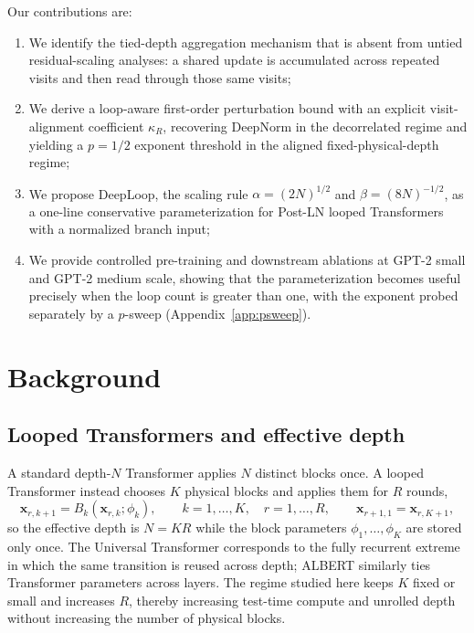 \documentclass[11pt]{airesearch}
\begin{document}
Our contributions are:
\begin{enumerate}[leftmargin=*, itemsep=1pt, topsep=1pt]
    \item We identify the tied-depth aggregation mechanism that is absent from
    untied residual-scaling analyses: a shared update is accumulated across
    repeated visits and then read through those same visits;
    \item We derive a loop-aware first-order perturbation bound with an
    explicit visit-alignment coefficient $\kappa_R$, recovering DeepNorm in the
    decorrelated regime and yielding a $p=1/2$ exponent threshold in the
    aligned fixed-physical-depth regime;
    \item We propose DeepLoop, the scaling rule
    $\alpha=(2N)^{1/2}$ and $\beta=(8N)^{-1/2}$, as a one-line conservative
    parameterization for Post-LN looped Transformers with a normalized branch
    input;
    \item We provide controlled pre-training and downstream ablations at GPT-2
    small and GPT-2 medium scale, showing that the parameterization becomes
    useful precisely when the loop count is greater than one, with the
    exponent probed separately by a $p$-sweep (Appendix~\ref{app:psweep}).
\end{enumerate}
\section{Background}
\label{sec:background}

\subsection{Looped Transformers and effective depth}
\label{sec:background:looped}

A standard depth-$N$ Transformer applies $N$ distinct blocks once. A
looped Transformer instead chooses $K$ physical blocks and applies them
for $R$ rounds,
\begin{equation}
  \mathbf{x}_{r,k+1}
  = B_k(\mathbf{x}_{r,k};\phi_k),
  \qquad
  k=1,\ldots,K,\quad r=1,\ldots,R,
  \qquad
  \mathbf{x}_{r+1,1}=\mathbf{x}_{r,K+1},
\end{equation}
so the effective depth is $N=KR$ while the block parameters
$\phi_1,\ldots,\phi_K$ are stored only once. The Universal Transformer
\citep{dehghani2018universal} corresponds to the fully recurrent
extreme in which the same transition is reused across depth; ALBERT
\citep{lan2019albert} similarly ties Transformer parameters across
layers. The regime studied here keeps $K$ fixed or small and increases
$R$, thereby increasing test-time compute and unrolled depth without
increasing the number of physical blocks.
\end{document}
